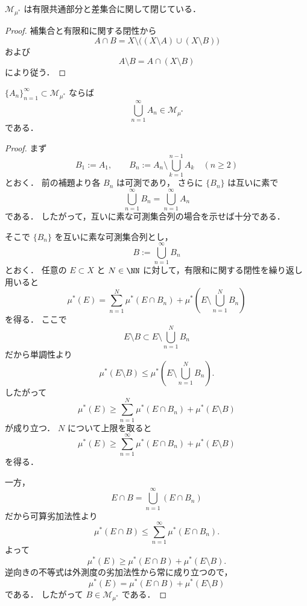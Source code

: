 \begin{lemma}
$\mathcal M_{\mu^*}$ は有限共通部分と差集合に関して閉じている．
\end{lemma}
\begin{proof}
補集合と有限和に関する閉性から
\[
A\cap B = X\setminus\bigl((X\setminus A)\cup(X\setminus B)\bigr)
\]
および
\[
A\setminus B=A\cap(X\setminus B)
\]
により従う．
\end{proof}

\begin{lemma}[可算和に関する閉性]
$\{A_n\}_{n=1}^{\infty}\subset \mathcal M_{\mu^*}$ ならば
\[
\bigcup_{n=1}^{\infty}A_n \in \mathcal M_{\mu^*}
\]
である．
\end{lemma}
\begin{proof}
まず
\[
B_1:=A_1,\qquad
B_n:=A_n\setminus \bigcup_{k=1}^{n-1}A_k\quad(n\ge 2)
\]
とおく．
前の補題より各 $B_n$ は可測であり，
さらに $\{B_n\}$ は互いに素で
\[
\bigcup_{n=1}^{\infty}B_n=\bigcup_{n=1}^{\infty}A_n
\]
である．
したがって，互いに素な可測集合列の場合を示せば十分である．

そこで $\{B_n\}$ を互いに素な可測集合列とし，
\[
B:=\bigcup_{n=1}^{\infty}B_n
\]
とおく．
任意の $E \subset X$ と $N \in \NN$ に対して，有限和に関する閉性を繰り返し用いると
\[
\mu^*(E)
=
\sum_{n=1}^{N}\mu^*(E\cap B_n)
+\mu^*\left(E\setminus \bigcup_{n=1}^{N}B_n\right)
\]
を得る．
ここで
\[
E\setminus B \subset E\setminus \bigcup_{n=1}^{N}B_n
\]
だから単調性より
\[
\mu^*(E\setminus B)
\le
\mu^*\left(E\setminus \bigcup_{n=1}^{N}B_n\right).
\]
したがって
\[
\mu^*(E)
\ge
\sum_{n=1}^{N}\mu^*(E\cap B_n)+\mu^*(E\setminus B)
\]
が成り立つ．
$N$ について上限を取ると
\[
\mu^*(E)
\ge
\sum_{n=1}^{\infty}\mu^*(E\cap B_n)+\mu^*(E\setminus B)
\]
を得る．

一方，
\[
E\cap B=\bigcup_{n=1}^{\infty}(E\cap B_n)
\]
だから可算劣加法性より
\[
\mu^*(E\cap B)
\le
\sum_{n=1}^{\infty}\mu^*(E\cap B_n).
\]
よって
\[
\mu^*(E)
\ge
\mu^*(E\cap B)+\mu^*(E\setminus B).
\]
逆向きの不等式は外測度の劣加法性から常に成り立つので，
\[
\mu^*(E)
=
\mu^*(E\cap B)+\mu^*(E\setminus B)
\]
である．
したがって $B \in \mathcal M_{\mu^*}$ である．
\end{proof}

